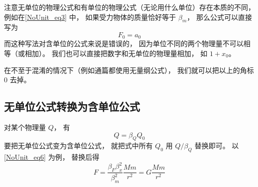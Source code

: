 注意无单位的物理公式和有单位的物理公式（无论用什么单位）存在本质的不同， 例如在\autoref{NoUnit_eq3} 中， 如果受力物体的质量恰好等于 $\beta_m$， 那么公式可以直接写为
\begin{equation}\label{NoUnit_eq7}
F_0 = a_0
\end{equation}
而这种写法对含单位的公式来说是错误的， 因为单位不同的两个物理量不可以相等（或相加）。 我们也可以直接把数字和无单位的物理量相加， 如 $1 + x_0$。

在不至于混淆的情况下（例如通篇都使用无量纲公式）， 我们就可以把以上的角标 $0$ 去掉。

\subsection{无单位公式转换为含单位公式}
对某个物理量 $Q$， 有
\begin{equation}
Q = \beta_Q Q_0
\end{equation}
要把无单位公式变为含单位公式， 就把式中所有 $Q_0$ 用 $Q/\beta_Q$ 替换即可。 以\autoref{NoUnit_eq6} 为例， 替换后得
\begin{equation}
F = \frac{\beta_F\beta_x^2}{\beta_m^2} \frac{Mm}{r^2} = G\frac{Mm}{r^2}
\end{equation}
